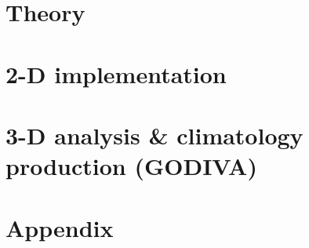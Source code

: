 



\nocite{*} 				%
\frontmatter


\pagestyle{plain}




\dominitoc
\setcounter{tocdepth}{1}
\tableofcontents

\mainmatter
\pagestyle{fancy}



\thispagestyle{empty}
\part{\diva Theory\label{part:theory}}









\thispagestyle{empty}
\part{2-D implementation\label{part:2Dimplementation}}









\thispagestyle{empty}

\part{3-D analysis \& climatology production (GODIVA)\label{part:godiva}}







\thispagestyle{empty}
\part{Appendix\label{part:appendix}}
\appendix




\pagestyle{plain}

%



\listoffigures
\listoftables
\printindex


	
	
